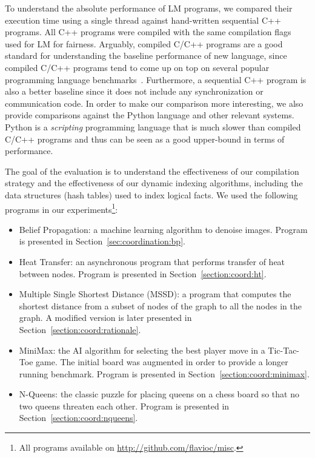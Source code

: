 To understand the absolute performance of LM programs, we compared their
execution time using a single thread against hand-written sequential C++
programs. All C++ programs were compiled with the same compilation flags used
for LM for fairness. Arguably, compiled C/C++ programs are a good standard for
understanding the baseline performance of new language, since compiled C/C++
programs tend to come up on top on several popular programming language
benchmarks~\cite{language_benchmarks}. Furthermore, a sequential C++ program is
also a better baseline since it does not include any synchronization or
communication code. In order to make our comparison more interesting, we also
provide comparisons against the Python language and other relevant systems.
Python is a \emph{scripting} programming language that is much slower than
compiled C/C++ programs and thus can be seen as a good upper-bound in terms of
performance.

The goal of the evaluation is to understand the effectiveness of our compilation
strategy and the effectiveness of our dynamic indexing algorithms, including the
data structures (hash tables) used to index logical facts. We used the following
programs in our experiments\footnote{All programs available on
   \url{http://github.com/flavioc/misc}.}:

\begin{itemize}
   \item Belief Propagation: a machine learning algorithm to denoise images. Program is
      presented in Section~\ref{sec:coordination:bp}.

   \item Heat Transfer: an asynchronous program that performs transfer of heat
      between nodes. Program is presented in Section~\ref{section:coord:ht}.

   \item Multiple Single Shortest Distance (MSSD): a program that computes the
      shortest distance from a subset of nodes of the graph to all the nodes in
      the graph. A modified version is later presented in
      Section~\ref{section:coord:rationale}.

    \item MiniMax: the AI algorithm for selecting the best player move in a
       Tic-Tac-Toe game. The initial board was augmented in order to provide a
       longer running benchmark. Program is presented in
       Section~\ref{section:coord:minimax}.


   \item N-Queens: the classic puzzle for placing queens on a chess board so
      that no two queens threaten each other. Program is presented in
      Section~\ref{section:coord:nqueens}.

\end{itemize}

